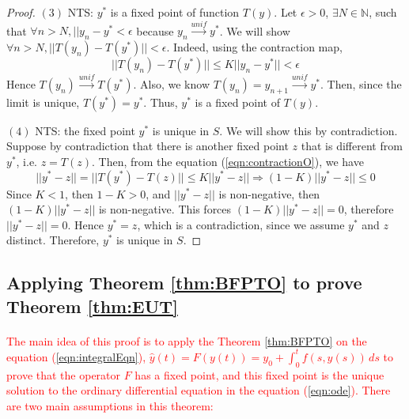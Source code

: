 \documentclass{article}
\theoremstyle{definition}
\theoremstyle{remark}
\begin{document}
\begin{proof}
    $(3)$ NTS: $y^{*}$ is a fixed point of function $T(y)$. \; Let $\epsilon > 0$, $\exists N \in \mathbb{N}$, such that $\forall n > N, \lvert\lvert y_n - y^{*} < \epsilon$ because $y_n \xrightarrow{unif} y^{*}$. We will show $\forall n > N, \lvert\lvert T(y_n) - T(y^{*}) \rvert\rvert < \epsilon$. Indeed, using the contraction map,
    \begin{equation}
        \lvert\lvert T(y_n) - T(y^{*}) \rvert\rvert \leq K \lvert\lvert y_n - y^{*} \rvert\rvert < \epsilon
    \end{equation}
    Hence $T(y_n) \xrightarrow{unif} T(y^{*})$. Also, we know $T(y_n) = y_{n+1} \xrightarrow{unif} y^{*}$. Then, since the limit is unique, $T(y^{*}) = y^{*}$. Thus, $y^{*}$ is a fixed point of $T(y)$.
    
    $(4)$ NTS: the fixed point $y^{*}$ is unique in $S$. \; We will show this by contradiction. Suppose by contradiction that there is another fixed point $z$ that is different from $y^{*}$, i.e. $z = T(z)$. Then, from the equation (\ref{eqn:contractionO}), we have
    \begin{equation}
        \lvert\lvert y^{*} - z \rvert\rvert =\lvert\lvert T(y^{*}) - T(z) \rvert\rvert \leq K \lvert\lvert y^{*} - z \rvert\rvert \Rightarrow (1-K)\lvert\lvert y^{*} - z \rvert\rvert \leq 0
    \end{equation}
    Since $K < 1$, then $1 - K > 0$, and $\lvert\lvert y^{*} - z \rvert\rvert$ is non-negative, then $(1-K)\lvert\lvert y^{*} - z \rvert\rvert$ is non-negative. This forces $(1-K)\lvert\lvert y^{*} - z \rvert\rvert = 0$, therefore $\lvert\lvert y^{*} - z\rvert\rvert = 0$. Hence $y^{*} = z$, which is a contradiction, since we assume $y^{*}$ and $z$ distinct. Therefore, $y^{*}$ is unique in $S$.
\end{proof}

\subsection{Applying Theorem \ref{thm:BFPTO} to prove Theorem \ref{thm:EUT}}

\paragraph{  }

\textcolor{red}{The main idea of this proof is to apply the Theorem \ref{thm:BFPTO} on the equation (\ref{eqn:integralEqn}), $\hat{y}(t) = F(y(t)) = y_0 + \int_{0}^{t}{f(s,y(s))}\,ds$ to prove that the operator $F$ has a fixed point, and this fixed point is the unique solution to the ordinary differential equation in the equation (\ref{eqn:ode}). There are two main assumptions in this theorem: }
\end{document}
